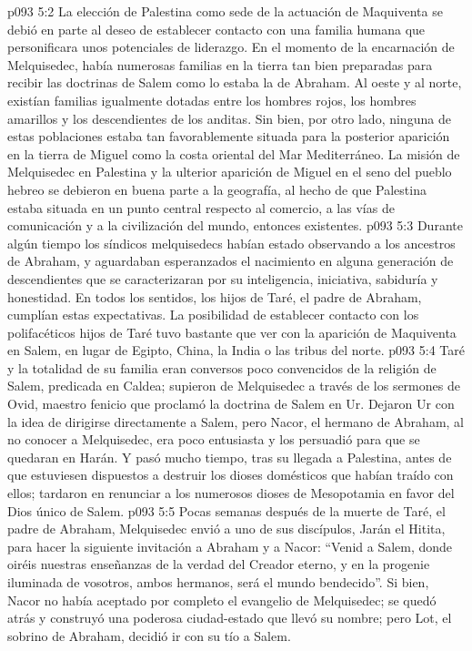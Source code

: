 \vs p093 5:2 La elección de Palestina como sede de la actuación de Maquiventa se debió en parte al deseo de establecer contacto con una familia humana que personificara unos potenciales de liderazgo. En el momento de la encarnación de Melquisedec, había numerosas familias en la tierra tan bien preparadas para recibir las doctrinas de Salem como lo estaba la de Abraham. Al oeste y al norte, existían familias igualmente dotadas entre los hombres rojos, los hombres amarillos y los descendientes de los anditas. Sin bien, por otro lado, ninguna de estas poblaciones estaba tan favorablemente situada para la posterior aparición en la tierra de Miguel como la costa oriental del Mar Mediterráneo. La misión de Melquisedec en Palestina y la ulterior aparición de Miguel en el seno del pueblo hebreo se debieron en buena parte a la geografía, al hecho de que Palestina estaba situada en un punto central respecto al comercio, a las vías de comunicación y a la civilización del mundo, entonces existentes.
\vs p093 5:3 Durante algún tiempo los síndicos melquisedecs habían estado observando a los ancestros de Abraham, y aguardaban esperanzados el nacimiento en alguna generación de descendientes que se caracterizaran por su inteligencia, iniciativa, sabiduría y honestidad. En todos los sentidos, los hijos de Taré, el padre de Abraham, cumplían estas expectativas. La posibilidad de establecer contacto con los polifacéticos hijos de Taré tuvo bastante que ver con la aparición de Maquiventa en Salem, en lugar de Egipto, China, la India o las tribus del norte.
\vs p093 5:4 Taré y la totalidad de su familia eran conversos poco convencidos de la religión de Salem, predicada en Caldea; supieron de Melquisedec a través de los sermones de Ovid, maestro fenicio que proclamó la doctrina de Salem en Ur. Dejaron Ur con la idea de dirigirse directamente a Salem, pero Nacor, el hermano de Abraham, al no conocer a Melquisedec, era poco entusiasta y los persuadió para que se quedaran en Harán. Y pasó mucho tiempo, tras su llegada a Palestina, antes de que estuviesen dispuestos a destruir  los dioses domésticos que habían traído con ellos; tardaron en renunciar a los numerosos dioses de Mesopotamia en favor del Dios único de Salem.
\vs p093 5:5 Pocas semanas después de la muerte de Taré, el padre de Abraham, Melquisedec envió a uno de sus discípulos, Jarán el Hitita, para hacer la siguiente invitación a Abraham y a Nacor: “Venid a Salem, donde oiréis nuestras enseñanzas de la verdad del Creador eterno, y en la progenie iluminada de vosotros, ambos hermanos, será el mundo bendecido”. Si bien, Nacor no había aceptado por completo el evangelio de Melquisedec; se quedó atrás y construyó una poderosa ciudad\hyp{}estado que llevó su nombre; pero Lot, el sobrino de Abraham, decidió ir con su tío a Salem.

